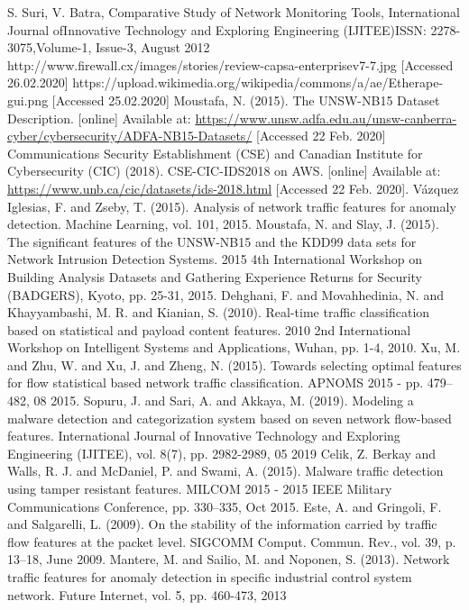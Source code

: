 \documentclass[conference]{IEEEtran}
\begin{document}
\begin{thebibliography}{00}
 S. Suri, V. Batra, Comparative Study of Network Monitoring Tools, International Journal ofInnovative Technology and Exploring Engineering (IJITEE)ISSN: 2278-3075,Volume-1, Issue-3, August 2012
 http://www.firewall.cx/images/stories/review-capsa-enterprisev7-7.jpg [Accessed 26.02.2020]
 https://upload.wikimedia.org/wikipedia/commons/a/ae/Etherape-gui.png [Accessed 25.02.2020]
 Moustafa, N. (2015). The UNSW-NB15 Dataset Description. [online] Available at: \url{https://www.unsw.adfa.edu.au/unsw-canberra-cyber/cybersecurity/ADFA-NB15-Datasets/} [Accessed 22 Feb. 2020]
 Communications Security Establishment (CSE) and Canadian Institute for Cybersecurity (CIC) (2018). CSE-CIC-IDS2018 on AWS. [online] Available at: \url{https://www.unb.ca/cic/datasets/ids-2018.html} [Accessed 22 Feb. 2020].
 Vázquez Iglesias, F. and Zseby, T. (2015). Analysis of network traffic features for anomaly detection. Machine Learning, vol. 101, 2015.
 Moustafa, N. and Slay, J. (2015). The significant features of the UNSW-NB15 and the KDD99 data sets for Network Intrusion Detection Systems. 2015 4th International Workshop on Building Analysis Datasets and Gathering Experience Returns for Security (BADGERS), Kyoto, pp. 25-31, 2015.
 Dehghani, F. and Movahhedinia, N. and Khayyambashi, M. R. and Kianian, S. (2010). Real-time traffic classification based on statistical and payload content features. 2010 2nd International Workshop on Intelligent Systems and Applications, Wuhan, pp. 1-4, 2010.
 Xu, M. and Zhu, W. and Xu, J. and Zheng, N. (2015). Towards selecting optimal features for flow statistical based network traffic classification. APNOMS 2015 - pp. 479–482, 08 2015.
 Sopuru, J. and Sari, A. and Akkaya, M. (2019). Modeling a malware detection and categorization system based on seven network flow-based features. International Journal of Innovative Technology and Exploring Engineering (IJITEE), vol. 8(7), pp. 2982-2989, 05 2019
 Celik, Z. Berkay and Walls, R. J. and McDaniel, P. and Swami, A. (2015). Malware traffic detection using tamper resistant features. MILCOM 2015 - 2015 IEEE Military Communications Conference, pp. 330–335, Oct 2015.
 Este, A. and Gringoli, F. and Salgarelli, L. (2009). On the stability of the information carried by traffic flow features at the packet level. SIGCOMM Comput. Commun. Rev., vol. 39, p. 13–18, June 2009.
 Mantere, M. and Sailio, M. and Noponen, S. (2013). Network traffic features for anomaly detection in specific industrial control system network. Future Internet, vol. 5, pp. 460-473, 2013

\end{thebibliography}
\end{document}
